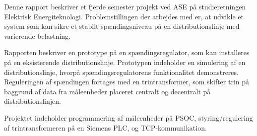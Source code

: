 
Denne rapport beskriver et fjerde semester projekt ved ASE på studieretningen Elektrisk Energiteknologi. Problemstillingen der arbejdes med er, at udvikle et system som kan sikre et stabilt spændingsniveau på en distributionslinje med varierende belastning.

Rapporten beskriver en prototype på en spændingsregulator, som kan installeres på en eksisterende distributionslinje. Prototypen indeholder en simulering af en distributionslinje, hvorpå spændingsregulatorens funktionalitet demonstreres. Reguleringen af spændingen fortages med en trintransformer, som skifter trin på baggrund af data fra måleenheder placeret centralt og decentralt på distributionslinjen.

Projektet indeholder programmering af måleenheder på PSOC, styring/regulering af trintransformeren på en Siemens PLC, og TCP-kommunikation. 